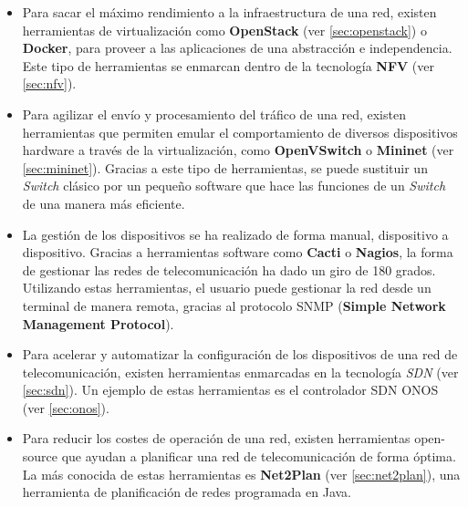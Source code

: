 \begin{itemize}
	\item Para sacar el máximo rendimiento a la infraestructura de una red, existen herramientas de virtualización como \textbf{OpenStack} (ver \ref{sec:openstack}) o \textbf{Docker}, para proveer a las aplicaciones de una abstracción e independencia. Este tipo de herramientas se enmarcan dentro de la tecnología \textbf{NFV} (ver \ref{sec:nfv}).
	
	\item Para agilizar el envío y procesamiento del tráfico de una red, existen herramientas que permiten emular el comportamiento de diversos dispositivos hardware a través de la virtualización, como \textbf{OpenVSwitch} o \textbf{Mininet} (ver \ref{sec:mininet}). Gracias a este tipo de herramientas, se puede sustituir un \textit{Switch} clásico por un pequeño software que hace las funciones de un \textit{Switch} de una manera más eficiente.
	
	\item La gestión de los dispositivos se ha realizado de forma manual, dispositivo a dispositivo. Gracias a herramientas software como \textbf{Cacti} o \textbf{Nagios}, la forma de gestionar las redes de telecomunicación ha dado un giro de 180 grados. Utilizando estas herramientas, el usuario puede gestionar la red desde un terminal de manera remota, gracias al protocolo SNMP (\textbf{Simple Network Management Protocol}).
	
	\item Para acelerar y automatizar la configuración de los dispositivos de una red de telecomunicación, existen herramientas enmarcadas en la tecnología \textit{SDN} (ver \ref{sec:sdn}). Un ejemplo de estas herramientas es el controlador SDN ONOS (ver \ref{sec:onos}).
	
	\item Para reducir los costes de operación de una red, existen herramientas open-source que ayudan a planificar una red de telecomunicación de forma óptima. La más conocida de estas herramientas es \textbf{Net2Plan} (ver \ref{sec:net2plan}), una herramienta de planificación de redes programada en Java.
\end{itemize}



\cleardoublepage